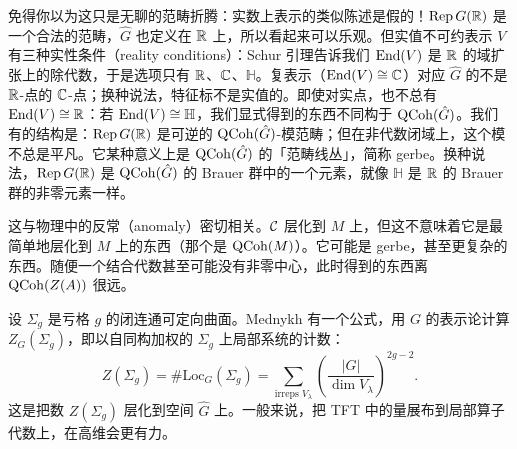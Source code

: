 免得你以为这只是无聊的范畴折腾：实数上表示的类似陈述是假的！$\operatorname{Rep} G(\mathbb{R})$ 是一个合法的范畴，$\hat G$ 也定义在 $\mathbb{R}$ 上，所以看起来可以乐观。但实值不可约表示 $V$ 有三种实性条件（reality conditions）：Schur 引理告诉我们 $\operatorname{End}(V)$ 是 $\mathbb{R}$ 的域扩张上的除代数，于是选项只有 $\mathbb{R}$、$\mathbb{C}$、$\mathbb H$。复表示（$\operatorname{End}(V)\cong\mathbb{C}$）对应 $\hat G$ 的不是 $\mathbb{R}$-点的 $\mathbb{C}$-点；换种说法，特征标不是实值的。即使对实点，也不总有 $\operatorname{End}(V)\cong\mathbb{R}$：若 $\operatorname{End}(V)\cong\mathbb H$，我们显式得到的东西不同构于 $\mathrm{QCoh}(\hat G)$。我们有的结构是：$\operatorname{Rep} G(\mathbb{R})$ 是可逆的 $\mathrm{QCoh}(\hat G)$-模范畴；但在非代数闭域上，这个模不总是平凡。它某种意义上是 $\mathrm{QCoh}(\hat G)$ 的「范畴线丛」，简称 gerbe。换种说法，$\operatorname{Rep} G(\mathbb{R})$ 是 $\mathrm{QCoh}(\hat G)$ 的 Brauer 群中的一个元素，就像 $\mathbb H$ 是 $\mathbb{R}$ 的 Brauer 群的非零元素一样。

这与物理中的反常（anomaly）密切相关。$\mathcal{C}$ 层化到 $M$ 上，但这不意味着它是最简单地层化到 $M$ 上的东西（那个是 $\mathrm{QCoh}(M)$）。它可能是 gerbe，甚至更复杂的东西。随便一个结合代数甚至可能没有非零中心，此时得到的东西离 $\mathrm{QCoh}(Z(A))$ 很远。

\begin{remark}
设 $\Sigma_g$ 是亏格 $g$ 的闭连通可定向曲面。Mednykh 有一个公式，用 $G$ 的表示论计算 $Z_G(\Sigma_g)$，即以自同构加权的 $\Sigma_g$ 上局部系统的计数：
\[
Z(\Sigma_g)=\#\mathrm{Loc}_G(\Sigma_g)=\sum_{\text{irreps }V_\lambda}\left(\frac{|G|}{\dim V_\lambda}\right)^{2g-2}.
\]
这是把数 $Z(\Sigma_g)$ 层化到空间 $\hat G$ 上。一般来说，把 TFT 中的量展布到局部算子代数上，在高维会更有力。
\end{remark}

